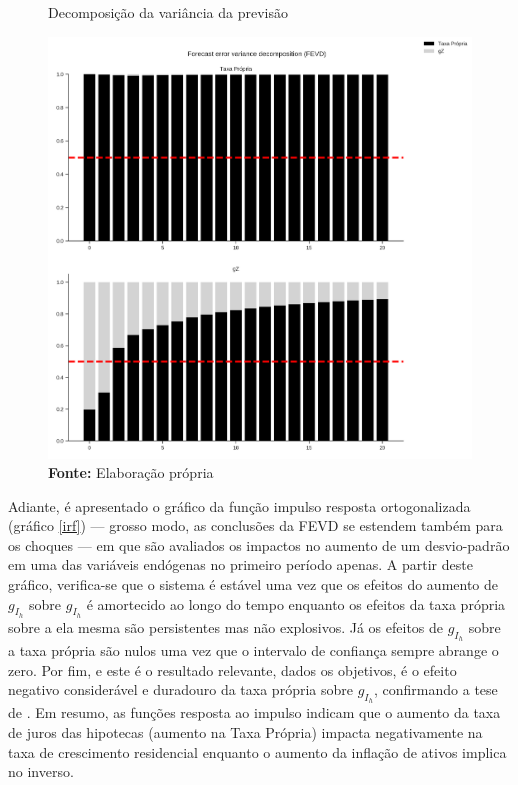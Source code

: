 \begin{figure}[htb]
	\centering
	\caption{Decomposição da variância da previsão}
	\label{fevd}
	\includegraphics[width=\textwidth]{../../Modelo/SeriesTemporais/figs/FEVD_VECMpython_TxPropria.png}
	\caption*{\textbf{Fonte:} Elaboração própria}
\end{figure}


Adiante, é apresentado o gráfico da função impulso resposta ortogonalizada (gráfico \ref{irf}) --- grosso modo, as conclusões da FEVD se estendem também para os choques --- em que são avaliados os impactos no aumento de um desvio-padrão em uma das variáveis endógenas no primeiro período apenas.
A partir deste gráfico, verifica-se que o sistema é estável uma vez que os efeitos do aumento de $g_{I_h}$ sobre $g_{I_h}$ é amortecido ao longo do tempo enquanto os efeitos da taxa própria sobre a ela mesma são persistentes mas não explosivos.
Já os efeitos de $g_{I_h}$ sobre a taxa própria são nulos uma vez que o intervalo de confiança sempre abrange o zero. Por fim, e este é o resultado relevante, dados os objetivos, é o efeito negativo considerável e duradouro da taxa própria sobre $g_{I_h}$, confirmando a tese de \textcite{teixeira_crescimento_2015}.
Em resumo, as funções resposta ao impulso indicam que o aumento da taxa de juros das hipotecas (aumento na Taxa Própria) impacta negativamente na taxa de crescimento residencial enquanto o aumento da inflação de ativos implica no inverso. 


